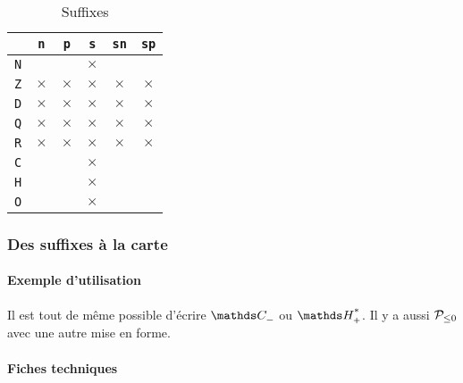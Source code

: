 \documentclass[12pt,a4paper]{scrartcl}
\theoremstyle{definition}
\begin{document}

\newcommand\xx{\phantom{$\times$}}
\begin{table}[h]
    \caption{Suffixes}
    \begin{center}
        \begin{tabular}{c|c|c|c|c|c}
              & \verb+n+ & \verb+p+ & \verb+s+ & \verb+sn+ & \verb+sp+ \\
            \hline \verb+N+ & \xx & \xx & $\times$ & \xx & \xx \\
            \hline \verb+Z+ & $\times$ & $\times$ & $\times$ & $\times$ & $\times$ \\
            \hline \verb+D+ & $\times$ & $\times$ & $\times$ & $\times$ & $\times$ \\
            \hline \verb+Q+ & $\times$ & $\times$ & $\times$ & $\times$ & $\times$ \\
            \hline \verb+R+ & $\times$ & $\times$ & $\times$ & $\times$ & $\times$ \\
            \hline \verb+C+ & \xx & \xx & $\times$ & \xx & \xx \\
            \hline \verb+H+ & \xx & \xx & $\times$ & \xx & \xx \\
            \hline \verb+O+ & \xx & \xx & $\times$ & \xx & \xx \\
        \end{tabular}
    \end{center}
    \label{table:suffixes-sets}
\end{table}




        \subsubsection{Des suffixes à la carte}

            \paragraph{Exemple d'utilisation}

\begin{tcblisting}{}
Il est tout de même possible d'écrire $\specialset{\CC}{n}$ ou $\specialset{\HH}{sp}$.
Il y a aussi $\specialset*{\probaset{P}}{n}$ avec une autre mise en forme.
\end{tcblisting}


            \paragraph{Fiches techniques}
\end{document}

